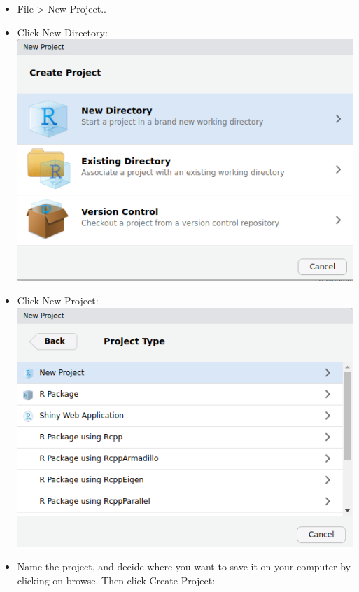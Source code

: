 \documentclass[]{book}
\providecommand{\tightlist}{%
  \setlength{\itemsep}{0pt}\setlength{\parskip}{0pt}}
\begin{document}
\begin{enumerate}
  \begin{itemize}
  \tightlist
  \item
    File \textgreater{} New Project..
  \item
    Click New Directory:\\
    \includegraphics{images/installing_intro/newproj1.png}
  \item
    Click New Project:\\
    \includegraphics{images/installing_intro/newproj2.png}
  \item
    Name the project, and decide where you want to save it on your computer by clicking on browse. Then click Create Project:\\

\end{itemize}
\end{enumerate}
\end{document}
